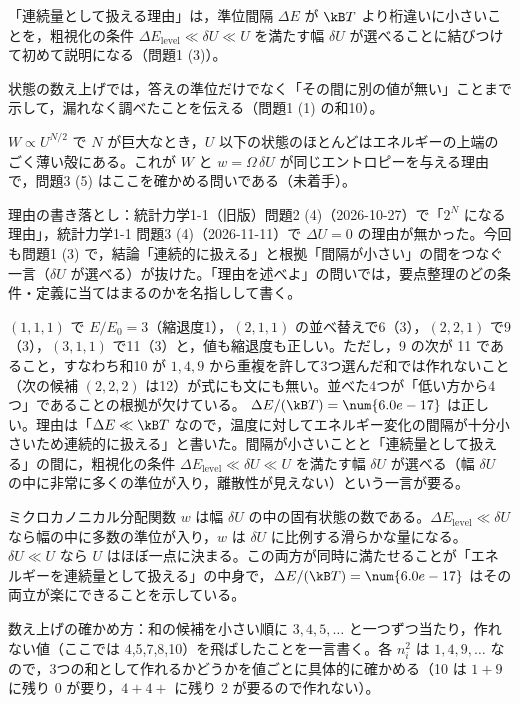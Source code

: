 \begin{daiji}
  \item 「連続量として扱える理由」は，準位間隔 $\Delta E$ が $\kB T$ より桁違いに小さいことを，粗視化の条件 $\Delta E_{\mathrm{level}}\ll\delta U\ll U$ を満たす幅 $\delta U$ が選べることに結びつけて初めて説明になる（問題1 (3)）。
  \item 状態の数え上げでは，答えの準位だけでなく「その間に別の値が無い」ことまで示して，漏れなく調べたことを伝える（問題1 (1) の和10）。
  \item $W\propto U^{N/2}$ で $N$ が巨大なとき，$U$ 以下の状態のほとんどはエネルギーの上端のごく薄い殻にある。これが $W$ と $w=\Omega\,\delta U$ が同じエントロピーを与える理由で，問題3 (5) はここを確かめる問いである（未着手）。
\end{daiji}
\begin{maemo}
  \item 理由の書き落とし：統計力学1-1（旧版）問題2 (4)（2026-10-27）で「$2^{N}$ になる理由」，統計力学1-1 問題3 (4)（2026-11-11）で $\Delta U=0$ の理由が無かった。今回も問題1 (3) で，結論「連続的に扱える」と根拠「間隔が小さい」の間をつなぐ一言（$\delta U$ が選べる）が抜けた。「理由を述べよ」の問いでは，要点整理のどの条件・定義に当てはまるのかを名指しして書く。
\end{maemo}
\begin{kotaeran}
   $(1,1,1)$ で $E/E_{0}=3$（縮退度1），$(2,1,1)$ の並べ替えで6（3），$(2,2,1)$ で9（3），$(3,1,1)$ で11（3）と，値も縮退度も正しい。ただし，9 の次が 11 であること，すなわち和10 が $1,4,9$ から重複を許して3つ選んだ和では作れないこと（次の候補 $(2,2,2)$ は12）が式にも文にも無い。並べた4つが「低い方から4つ」であることの根拠が欠けている。
   $\Delta E/(\kB T)=\num{6.0e-17}$ は正しい。理由は「$\Delta E\ll\kB T$ なので，温度に対してエネルギー変化の間隔が十分小さいため連続的に扱える」と書いた。間隔が小さいことと「連続量として扱える」の間に，粗視化の条件 $\Delta E_{\mathrm{level}}\ll\delta U\ll U$ を満たす幅 $\delta U$ が選べる（幅 $\delta U$ の中に非常に多くの準位が入り，離散性が見えない）という一言が要る。
\end{kotaeran}
\begin{rikai}
  \item ミクロカノニカル分配関数 $w$ は幅 $\delta U$ の中の固有状態の数である。$\Delta E_{\mathrm{level}}\ll\delta U$ なら幅の中に多数の準位が入り，$w$ は $\delta U$ に比例する滑らかな量になる。$\delta U\ll U$ なら $U$ はほぼ一点に決まる。この両方が同時に満たせることが「エネルギーを連続量として扱える」の中身で，$\Delta E/(\kB T)=\num{6.0e-17}$ はその両立が楽にできることを示している。
  \item 数え上げの確かめ方：和の候補を小さい順に $3,4,5,\dots$ と一つずつ当たり，作れない値（ここでは 4,5,7,8,10）を飛ばしたことを一言書く。各 $n_{i}^{2}$ は $1,4,9,\dots$ なので，3つの和として作れるかどうかを値ごとに具体的に確かめる（10 は $1+9$ に残り $0$ が要り，$4+4+$ に残り $2$ が要るので作れない）。
\end{rikai}
